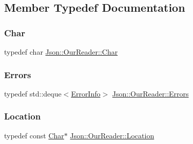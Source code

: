 \subsection{Member Typedef Documentation}
\mbox{\label{classJson_1_1OurReader_a0cd0bab4caa66594ab843ccd5f9dc239_a0cd0bab4caa66594ab843ccd5f9dc239}} 
\subsubsection{\texorpdfstring{Char}{Char}}
{\footnotesize\ttfamily typedef char \hyperlink{classJson_1_1OurReader_a0cd0bab4caa66594ab843ccd5f9dc239_a0cd0bab4caa66594ab843ccd5f9dc239}{Json\+::\+Our\+Reader\+::\+Char}}

\mbox{\label{classJson_1_1OurReader_a8cc69593ef7303e58e99bb5dbb767562_a8cc69593ef7303e58e99bb5dbb767562}} 
\subsubsection{\texorpdfstring{Errors}{Errors}}
{\footnotesize\ttfamily typedef std\+::deque$<$\hyperlink{classJson_1_1OurReader_1_1ErrorInfo}{Error\+Info}$>$ \hyperlink{classJson_1_1OurReader_a8cc69593ef7303e58e99bb5dbb767562_a8cc69593ef7303e58e99bb5dbb767562}{Json\+::\+Our\+Reader\+::\+Errors}\hspace{0.3cm}{\ttfamily [private]}}

\mbox{\label{classJson_1_1OurReader_a1bdc7bbc52ba87cae6b19746f2ee0189_a1bdc7bbc52ba87cae6b19746f2ee0189}} 
\subsubsection{\texorpdfstring{Location}{Location}}
{\footnotesize\ttfamily typedef const \hyperlink{classJson_1_1OurReader_a0cd0bab4caa66594ab843ccd5f9dc239_a0cd0bab4caa66594ab843ccd5f9dc239}{Char}$\ast$ \hyperlink{classJson_1_1OurReader_a1bdc7bbc52ba87cae6b19746f2ee0189_a1bdc7bbc52ba87cae6b19746f2ee0189}{Json\+::\+Our\+Reader\+::\+Location}}

